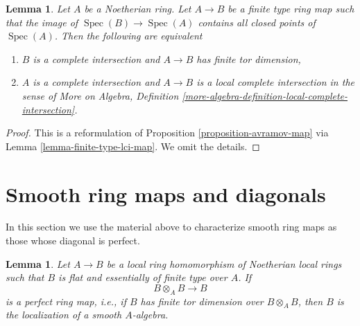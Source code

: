 \documentclass{stacks-project}
\theoremstyle{plain}
\newtheorem{lemma}[subsection]{Lemma}
\theoremstyle{definition}
\theoremstyle{remark}
\numberwithin{equation}{subsection}
\def\Spec{\mathop{\mathrm{Spec}}}
\begin{document}
\begin{lemma}
\label{lemma-avramov-map-finite-type}
Let $A$ be a Noetherian ring. Let $A \to B$ be a finite type ring map
such that the image of $\Spec(B) \to \Spec(A)$ contains all closed
points of $\Spec(A)$. Then the following are equivalent
\begin{enumerate}
\item $B$ is a complete intersection and $A \to B$ has finite
tor dimension,
\item $A$ is a complete intersection and $A \to B$ is a local complete
intersection in the sense of More on Algebra, Definition
\ref{more-algebra-definition-local-complete-intersection}.
\end{enumerate}
\end{lemma}

\begin{proof}
This is a reformulation of Proposition \ref{proposition-avramov-map}
via Lemma \ref{lemma-finite-type-lci-map}.
We omit the details.
\end{proof}








\section{Smooth ring maps and diagonals}
\label{section-smooth-diagonal-perfect}

\noindent
In this section we use the material above to characterize smooth ring maps as
those whose diagonal is perfect.

\begin{lemma}
\label{lemma-local-perfect-diagonal}
Let $A \to B$ be a local ring homomorphism of Noetherian local rings such that
$B$ is flat and essentially of finite type over $A$. If
$$
B \otimes_A B \longrightarrow B
$$
is a perfect ring map, i.e., if $B$ has finite tor dimension over
$B \otimes_A B$, then $B$ is the localization of a smooth $A$-algebra.
\end{lemma}
\end{document}
